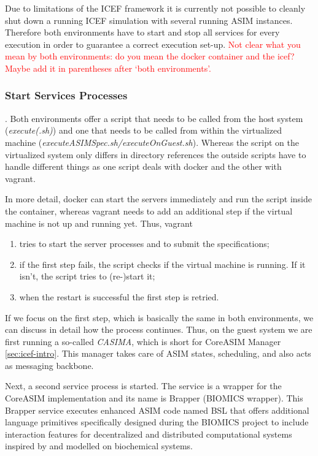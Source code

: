 Due to limitations of the ICEF framework it is currently not possible to cleanly shut down a running ICEF simulation with several running ASIM instances. Therefore both environments have to start and stop all services for every execution in order to guarantee a correct execution set-up.
\textcolor{red}{Not clear what you mean by both environments: do you mean the docker container and the icef? Maybe add it in parentheses after `both environments'.}

\subsubsection{Start Services Processes}.  Both environments offer a script that needs to be called from the host system (\textit{execute(.sh)}) and one that needs to be called from within the virtualized machine (\textit{executeASIMSpec.sh/executeOnGuest.sh}). Whereas the script on the virtualized system only differs in directory references the outside scripts have to handle different things as one script deals with docker and the other with vagrant.

In more detail, docker can start the servers immediately and run the script inside the container, whereas vagrant needs to add an additional step if the virtual machine is not up and running yet. Thus, vagrant
\begin{enumerate}
\vspace{-0.5cm}
	\item tries to start the server processes and to submit the specifications;
	\item if the first step fails, the script checks if the virtual machine is running. If it isn't, the script tries to (re-)start it;
	\item when the restart is successful the first step is retried.
\end{enumerate}

If we focus on the first step, which is basically the same in both environments, we can discuss in detail how the process continues. Thus, on the guest system we are first running a so-called \textit{CASIMA}, which is short for CoreASIM Manager \ref{sec:icef-intro}. This manager takes care of ASIM states, scheduling, and also acts as messaging backbone.

Next, a second service process is started. The service is a wrapper for the CoreASIM implementation and its name is Brapper (BIOMICS wrapper). This Brapper service executes enhanced ASIM code named BSL that offers additional language primitives specifically designed during the BIOMICS project to include interaction features for decentralized and distributed computational systems inspired by and modelled on biochemical systems.

